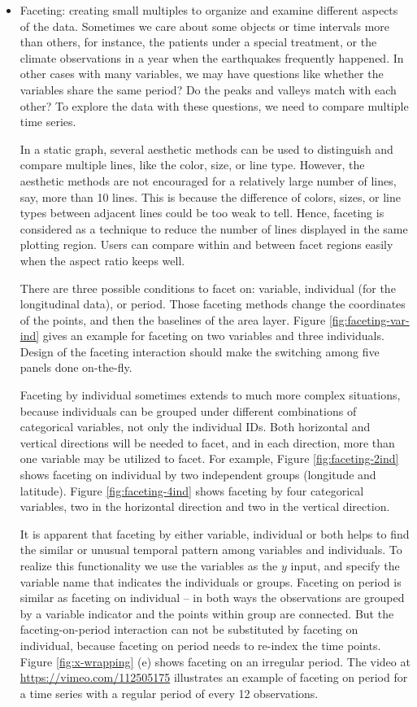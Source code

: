 \documentclass[12pt]{article}
\begin{document}
\begin{itemize}
\item Faceting: creating small multiples to organize and
examine different aspects of the data.
Sometimes we care about some objects or time intervals more than others,
for instance, the patients under a special treatment, or the climate
observations in a year when the earthquakes frequently happened. In
other cases with many variables, we may have questions like whether
the variables share the same period? Do the peaks and valleys match
with each other? To explore the data with these questions, we need
to compare multiple time series.

In a static graph, several aesthetic methods can be used to distinguish
and compare multiple lines, like the color, size, or line type. However,
the aesthetic methods are not encouraged for a relatively large number
of lines, say, more than 10 lines. This is because the difference
of colors, sizes, or line types between adjacent lines could be too
weak to tell. Hence, faceting is considered as a technique to reduce
the number of lines displayed in the same plotting region. Users can compare
within and between facet regions easily when the aspect ratio keeps
well.

There are three possible conditions to facet on: variable, individual
(for the longitudinal data), or period. Those faceting methods change
the coordinates of the points, and then the baselines of the area layer.
Figure \ref{fig:faceting-var-ind} gives an example for faceting on two
variables and three individuals. Design of the faceting interaction
should make the switching among five panels done on-the-fly. 

Faceting by individual sometimes extends to much more complex situations,
because individuals can be grouped under different combinations of
categorical variables, not only the individual IDs. Both horizontal
and vertical directions will be needed to facet, and in each direction,
more than one variable may be utilized to facet. For example, Figure
\ref{fig:faceting-2ind} shows faceting on individual by two independent
groups  (longitude and latitude). Figure \ref{fig:faceting-4ind} shows
faceting by four categorical variables, two in the horizontal direction
and two in the vertical direction.




It is apparent that faceting by either variable, individual or both
helps to find the similar or unusual temporal pattern among variables
and individuals. To realize this functionality we use the variables
as the $y$ input, and specify the variable name that indicates the individuals
or groups. Faceting on period is similar as faceting on individual
-- in both ways the observations are grouped by a variable indicator
and the points within group are connected. But the faceting-on-period
interaction can not be substituted by faceting on individual, because
faceting on period needs to re-index the time points. Figure
\ref{fig:x-wrapping} (e) shows faceting on an irregular period.
The video at \url{https://vimeo.com/112505175} illustrates an example
of faceting on period for a time series with a regular period of every
12 observations.


\end{itemize}
\end{document}
